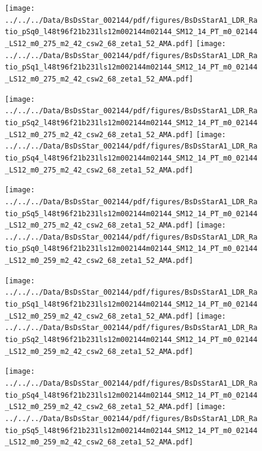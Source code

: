 \documentclass[a4paper,10pt]{article}
\begin{document}
\begin{figure}[p]
 \texttt{[image: ../../../Data/BsDsStar\_002144/pdf/figures/BsDsStarA1\_LDR\_Ratio\_pSq0\_l48t96f21b231ls12m002144m02144\_SM12\_14\_PT\_m0\_02144\_LS12\_m0\_275\_m2\_42\_csw2\_68\_zeta1\_52\_AMA.pdf]} 
 \texttt{[image: ../../../Data/BsDsStar\_002144/pdf/figures/BsDsStarA1\_LDR\_Ratio\_pSq1\_l48t96f21b231ls12m002144m02144\_SM12\_14\_PT\_m0\_02144\_LS12\_m0\_275\_m2\_42\_csw2\_68\_zeta1\_52\_AMA.pdf]} 
 \end{figure}
\begin{figure}[p]
 \texttt{[image: ../../../Data/BsDsStar\_002144/pdf/figures/BsDsStarA1\_LDR\_Ratio\_pSq2\_l48t96f21b231ls12m002144m02144\_SM12\_14\_PT\_m0\_02144\_LS12\_m0\_275\_m2\_42\_csw2\_68\_zeta1\_52\_AMA.pdf]} 
 \texttt{[image: ../../../Data/BsDsStar\_002144/pdf/figures/BsDsStarA1\_LDR\_Ratio\_pSq4\_l48t96f21b231ls12m002144m02144\_SM12\_14\_PT\_m0\_02144\_LS12\_m0\_275\_m2\_42\_csw2\_68\_zeta1\_52\_AMA.pdf]} 
 \end{figure}
\begin{figure}[p]
 \texttt{[image: ../../../Data/BsDsStar\_002144/pdf/figures/BsDsStarA1\_LDR\_Ratio\_pSq5\_l48t96f21b231ls12m002144m02144\_SM12\_14\_PT\_m0\_02144\_LS12\_m0\_275\_m2\_42\_csw2\_68\_zeta1\_52\_AMA.pdf]} 
 \texttt{[image: ../../../Data/BsDsStar\_002144/pdf/figures/BsDsStarA1\_LDR\_Ratio\_pSq0\_l48t96f21b231ls12m002144m02144\_SM12\_14\_PT\_m0\_02144\_LS12\_m0\_259\_m2\_42\_csw2\_68\_zeta1\_52\_AMA.pdf]} 
 \end{figure}
\clearpage
\begin{figure}[p]
 \texttt{[image: ../../../Data/BsDsStar\_002144/pdf/figures/BsDsStarA1\_LDR\_Ratio\_pSq1\_l48t96f21b231ls12m002144m02144\_SM12\_14\_PT\_m0\_02144\_LS12\_m0\_259\_m2\_42\_csw2\_68\_zeta1\_52\_AMA.pdf]} 
 \texttt{[image: ../../../Data/BsDsStar\_002144/pdf/figures/BsDsStarA1\_LDR\_Ratio\_pSq2\_l48t96f21b231ls12m002144m02144\_SM12\_14\_PT\_m0\_02144\_LS12\_m0\_259\_m2\_42\_csw2\_68\_zeta1\_52\_AMA.pdf]} 
 \end{figure}
\begin{figure}[p]
 \texttt{[image: ../../../Data/BsDsStar\_002144/pdf/figures/BsDsStarA1\_LDR\_Ratio\_pSq4\_l48t96f21b231ls12m002144m02144\_SM12\_14\_PT\_m0\_02144\_LS12\_m0\_259\_m2\_42\_csw2\_68\_zeta1\_52\_AMA.pdf]} 
 \texttt{[image: ../../../Data/BsDsStar\_002144/pdf/figures/BsDsStarA1\_LDR\_Ratio\_pSq5\_l48t96f21b231ls12m002144m02144\_SM12\_14\_PT\_m0\_02144\_LS12\_m0\_259\_m2\_42\_csw2\_68\_zeta1\_52\_AMA.pdf]} 
 \end{figure}
\clearpage
\end{document}

